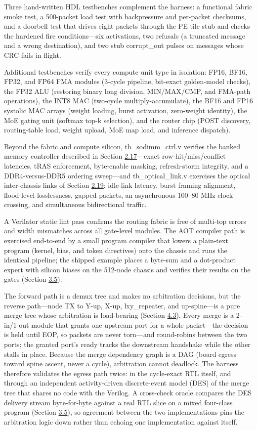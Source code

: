 \documentclass[12pt,onecolumn]{article}
\begin{document}
Three hand-written HDL testbenches complement the harness: a functional fabric smoke test, a 500-packet load test with backpressure and per-packet checksums, and a doorbell test that drives eight packets through the PE tile stub and checks the hardened fire conditions---six activations, two refusals (a truncated message and a wrong destination), and two stub corrupt\_out pulses on messages whose CRC fails in flight.

Additional testbenches verify every compute unit type in isolation: FP16, BF16, FP32, and FP64 FMA modules (3-cycle pipeline, bit-exact golden-model checks), the FP32 ALU (restoring binary long division, MIN/MAX/CMP, and FMA-path operations), the INT8 MAC (two-cycle multiply-accumulate), the BF16 and FP16 systolic MAC arrays (weight loading, burst activation, zero-weight identity), the MoE gating unit (softmax top-k selection), and the router chip (POST discovery, routing-table load, weight upload, MoE map load, and inference dispatch).

Beyond the fabric and compute silicon, tb\_sodimm\_ctrl.v verifies the banked memory controller described in Section \hyperref[sec:2.17]{2.17}---exact row-hit/miss/conflict latencies, tRAS enforcement, byte-enable masking, refresh-storm integrity, and a DDR4-versus-DDR5 ordering sweep---and tb\_optical\_link.v exercises the optical inter-chassis links of Section \hyperref[sec:2.19]{2.19}: idle-link latency, burst framing alignment, flood-level losslessness, gapped packets, an asynchronous 100--80 MHz clock crossing, and simultaneous bidirectional traffic.

A Verilator static lint pass confirms the routing fabric is free of multi-top errors and width mismatches across all gate-level modules. The AOT compiler path is exercised end-to-end by a small program compiler that lowers a plain-text program (kernel, bias, and token directives) onto the chassis and runs the identical pipeline; the shipped example places a byte-sum and a dot-product expert with silicon biases on the 512-node chassis and verifies their results on the gates (Section \hyperref[sec:3.5]{3.5}).

The forward path is a demux tree and makes no arbitration decisions, but the reverse path---node TX to Y-up, X-up, lxy\_repeater, and up-spine---is a pure merge tree whose arbitration is load-bearing (Section \hyperref[sec:4.3]{4.3}). Every merge is a 2-in/1-out module that grants one upstream port for a whole packet---the decision is held until EOP, so packets are never torn---and round-robins between the two ports; the granted port's ready tracks the downstream handshake while the other stalls in place. Because the merge dependency graph is a DAG (board egress toward spine ascent, never a cycle), arbitration cannot deadlock. The harness therefore validates the egress path twice: in the cycle-exact RTL itself, and through an independent activity-driven discrete-event model (DES) of the merge tree that shares no code with the Verilog. A cross-check oracle compares the DES delivery stream byte-for-byte against a real RTL slice on a mixed four-class program (Section \hyperref[sec:3.5]{3.5}), so agreement between the two implementations pins the arbitration logic down rather than echoing one implementation against itself.
\end{document}
